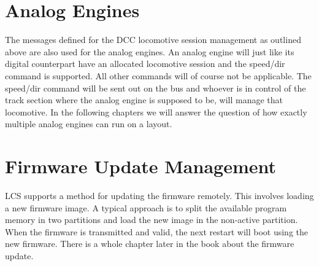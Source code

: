 \begin{table}[ht!]
    \centering 
    \caption{DCC Packet Error and Status}
\end{table}

\section{Analog Engines}

The messages defined for the DCC locomotive session management as outlined above are also used for the analog engines. An analog engine will just like its digital counterpart have an allocated locomotive session and the speed/dir command is supported. All other commands will of course not be applicable. The speed/dir command will be sent out on the bus and whoever is in control of the track section where the analog engine is supposed to be, will manage that locomotive. In the following chapters we will answer the question of how exactly multiple analog engines can run on a layout.

\section{Firmware Update Management}

LCS supports a method for updating the firmware remotely. This involves loading a new firmware image. A typical approach is to split the available program memory in two partitions and load the new image in the non-active partition. When the firmware is transmitted and valid, the next restart will boot using the new firmware. There is a whole chapter later in the book about the firmware update.

